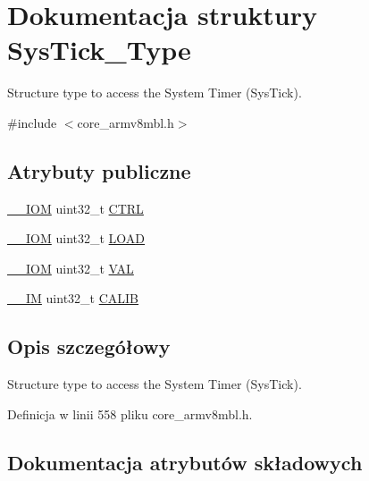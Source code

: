 \hypertarget{struct_sys_tick___type}{}\section{Dokumentacja struktury Sys\+Tick\+\_\+\+Type}
\label{struct_sys_tick___type}


Structure type to access the System Timer (Sys\+Tick).  




{\ttfamily \#include $<$core\+\_\+armv8mbl.\+h$>$}

\subsection*{Atrybuty publiczne}
\begin{DoxyCompactItemize}
\item 
\hyperlink{core__sc300_8h_ab6caba5853a60a17e8e04499b52bf691}{\+\_\+\+\_\+\+I\+OM} uint32\+\_\+t \hyperlink{struct_sys_tick___type_a875e7afa5c4fd43997fb544a4ac6e37e}{C\+T\+RL}
\item 
\hyperlink{core__sc300_8h_ab6caba5853a60a17e8e04499b52bf691}{\+\_\+\+\_\+\+I\+OM} uint32\+\_\+t \hyperlink{struct_sys_tick___type_a4780a489256bb9f54d0ba8ed4de191cd}{L\+O\+AD}
\item 
\hyperlink{core__sc300_8h_ab6caba5853a60a17e8e04499b52bf691}{\+\_\+\+\_\+\+I\+OM} uint32\+\_\+t \hyperlink{struct_sys_tick___type_a9b5420d17e8e43104ddd4ae5a610af93}{V\+AL}
\item 
\hyperlink{core__sc300_8h_a4cc1649793116d7c2d8afce7a4ffce43}{\+\_\+\+\_\+\+IM} uint32\+\_\+t \hyperlink{struct_sys_tick___type_afcadb0c6d35b21cdc0018658a13942de}{C\+A\+L\+IB}
\end{DoxyCompactItemize}


\subsection{Opis szczegółowy}
Structure type to access the System Timer (Sys\+Tick). 

Definicja w linii 558 pliku core\+\_\+armv8mbl.\+h.



\subsection{Dokumentacja atrybutów składowych}
\mbox{\label{struct_sys_tick___type_afcadb0c6d35b21cdc0018658a13942de}} 
